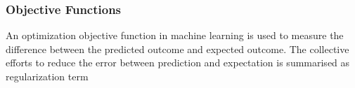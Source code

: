 \subsubsection{Objective Functions}
An optimization objective function in machine learning is used to measure the difference between the predicted outcome and expected outcome. The collective efforts to reduce the error between prediction and expectation is summarised as regularization term 